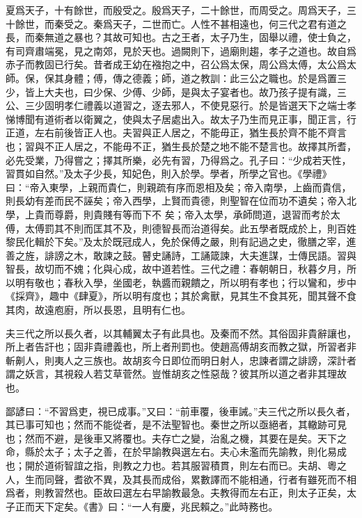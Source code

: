 \documentclass[12pt,a4paper]{ctexbook}
\begin{document}
夏爲天子，十有餘世，而殷受之。殷爲天子，二十餘世，而周受之。周爲天子，三十餘世，而秦受之。秦爲天子，二世而亡。人性不甚相遠也，何三代之君有道之長，而秦無道之暴也？其故可知也。古之王者，太子乃生，固舉以禮，使士負之，有司齊肅端冕，見之南郊，見於天也。過闕則下，過廟則趨，孝子之道也。故自爲赤子而教固已行矣。昔者成王幼在襁抱之中，召公爲太保，周公爲太傅，太公爲太師。保，保其身體；傅，傳之德義；師，道之教訓：此三公之職也。於是爲置三少，皆上大夫也，曰少保、少傅、少師，是與太子宴者也。故乃孩子提有識，三公、三少固明孝仁禮義以道習之，逐去邪人，不使見惡行。於是皆選天下之端士孝悌博聞有道術者以衛翼之，使與太子居處出入。故太子乃生而見正事，聞正言，行正道，左右前後皆正人也。夫習與正人居之，不能毋正，猶生長於齊不能不齊言也；習與不正人居之，不能毋不正，猶生長於楚之地不能不楚言也。故擇其所耆，必先受業，乃得嘗之；擇其所樂，必先有習，乃得爲之。孔子曰：“少成若天性，習貫如自然。”及太子少長，知妃色，則入於學。學者，所學之官也。《學禮》曰：“帝入東學，上親而貴仁，則親疏有序而恩相及矣；帝入南學，上齒而貴信，則長幼有差而民不誣矣；帝入西學，上賢而貴德，則聖智在位而功不遺矣；帝入北學，上貴而尊爵，則貴賤有等而下不 矣；帝入太學，承師問道，退習而考於太傅，太傅罰其不則而匡其不及，則德智長而治道得矣。此五學者既成於上，則百姓黎民化輯於下矣。”及太於既冠成人，免於保傅之嚴，則有記過之史，徹膳之宰，進善之旌，誹謗之木，敢諫之鼓。瞽史誦詩，工誦箴諫，大夫進謀，士傳民語。習與智長，故切而不媿；化與心成，故中道若性。三代之禮：春朝朝日，秋暮夕月，所以明有敬也；春秋入學，坐國老，執醬而親饋之，所以明有孝也；行以鸞和，步中《採齊》，趣中《肆夏》，所以明有度也；其於禽獸，見其生不食其死，聞其聲不食其肉，故遠庖廚，所以長恩，且明有仁也。\par
夫三代之所以長久者，以其輔翼太子有此具也。及秦而不然。其俗固非貴辭讓也，所上者告訐也；固非貴禮義也，所上者刑罰也。使趙高傅胡亥而教之獄，所習者非斬劓人，則夷人之三族也。故胡亥今日即位而明日射人，忠諫者謂之誹謗，深計者謂之妖言，其視殺人若艾草菅然。豈惟胡亥之性惡哉？彼其所以道之者非其理故也。\par
鄙諺曰：“不習爲吏，視已成事。”又曰：“前車覆，後車誡。”夫三代之所以長久者，其已事可知也；然而不能從者，是不法聖智也。秦世之所以亟絕者，其轍跡可見也；然而不避，是後車又將覆也。夫存亡之變，治亂之機，其要在是矣。天下之命，縣於太子；太子之善，在於早諭教與選左右。夫心未濫而先諭教，則化易成也；開於道術智誼之指，則教之力也。若其服習積貫，則左右而已。夫胡、粵之人，生而同聲，耆欲不異，及其長而成俗，累數譯而不能相通，行者有雖死而不相爲者，則教習然也。臣故曰選左右早諭教最急。夫教得而左右正，則太子正矣，太子正而天下定矣。《書》曰：“一人有慶，兆民賴之。”此時務也。\par
\end{document}
